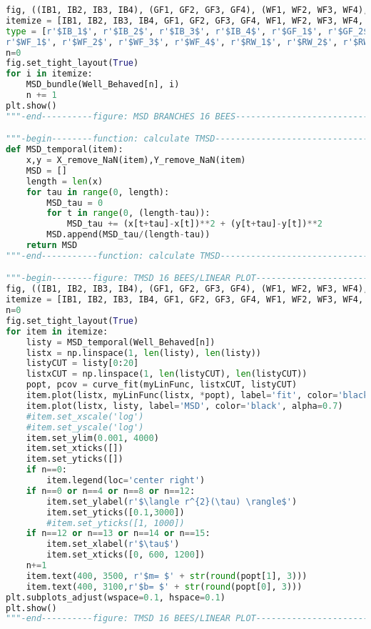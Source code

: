 \begin{lstlisting}[language=Python, basicstyle=\tiny, frame=single, keywordstyle=\color{teal}, commentstyle=\color{olive}, stringstyle=\color{red}]
fig, ((IB1, IB2, IB3, IB4), (GF1, GF2, GF3, GF4), (WF1, WF2, WF3, WF4), (RW1, RW2, RW3, RW4)) = plt.subplots(4, 4, figsize=(10,10))
itemize = [IB1, IB2, IB3, IB4, GF1, GF2, GF3, GF4, WF1, WF2, WF3, WF4, RW1, RW2, RW3, RW4]
type = [r'$IB_1$', r'$IB_2$', r'$IB_3$', r'$IB_4$', r'$GF_1$', r'$GF_2$', r'$GF_3$', r'$GF_4$', 
r'$WF_1$', r'$WF_2$', r'$WF_3$', r'$WF_4$', r'$RW_1$', r'$RW_2$', r'$RW_3$', r'$RW_4$']
n=0
fig.set_tight_layout(True)
for i in itemize:
    MSD_bundle(Well_Behaved[n], i)
    n += 1
plt.show()
"""-end----------figure: MSD BRANCHES 16 BEES--------------------------------"""

"""-begin--------function: calculate TMSD------------------------------------"""
def MSD_temporal(item):
    x,y = X_remove_NaN(item),Y_remove_NaN(item)
    MSD = []
    length = len(x)
    for tau in range(0, length):
        MSD_tau = 0
        for t in range(0, (length-tau)):
            MSD_tau += (x[t+tau]-x[t])**2 + (y[t+tau]-y[t])**2
        MSD.append(MSD_tau/(length-tau))
    return MSD
"""-end-----------function: calculate TMSD-----------------------------------"""

"""-begin--------figure: TMSD 16 BEES/LINEAR PLOT----------------------------"""
fig, ((IB1, IB2, IB3, IB4), (GF1, GF2, GF3, GF4), (WF1, WF2, WF3, WF4), (RW1, RW2, RW3, RW4)) = plt.subplots(4, 4, figsize=(10,10))
itemize = [IB1, IB2, IB3, IB4, GF1, GF2, GF3, GF4, WF1, WF2, WF3, WF4, RW1, RW2, RW3, RW4]
n=0
fig.set_tight_layout(True)
for item in itemize:
    listy = MSD_temporal(Well_Behaved[n])
    listx = np.linspace(1, len(listy), len(listy))
    listyCUT = listy[0:20]
    listxCUT = np.linspace(1, len(listyCUT), len(listyCUT))
    popt, pcov = curve_fit(myLinFunc, listxCUT, listyCUT)
    item.plot(listx, myLinFunc(listx, *popt), label='fit', color='black', linestyle='dotted')
    item.plot(listx, listy, label='MSD', color='black', alpha=0.7)
    #item.set_xscale('log')
    #item.set_yscale('log')
    item.set_ylim(0.001, 4000)
    item.set_xticks([])
    item.set_yticks([])
    if n==0:
        item.legend(loc='center right')
    if n==0 or n==4 or n==8 or n==12:
        item.set_ylabel(r'$\langle r^{2}(\tau) \rangle$')
        item.set_yticks([0.1,3000])
        #item.set_yticks([1, 1000])
    if n==12 or n==13 or n==14 or n==15:
        item.set_xlabel(r'$\tau$')
        item.set_xticks([0, 600, 1200])
    n+=1
    item.text(400, 3500, r'$m= $' + str(round(popt[1], 3)))
    item.text(400, 3100,r'$b= $' + str(round(popt[0], 3)))
plt.subplots_adjust(wspace=0.1, hspace=0.1)
plt.show()
"""-end----------figure: TMSD 16 BEES/LINEAR PLOT----------------------------"""


\end{lstlisting}
